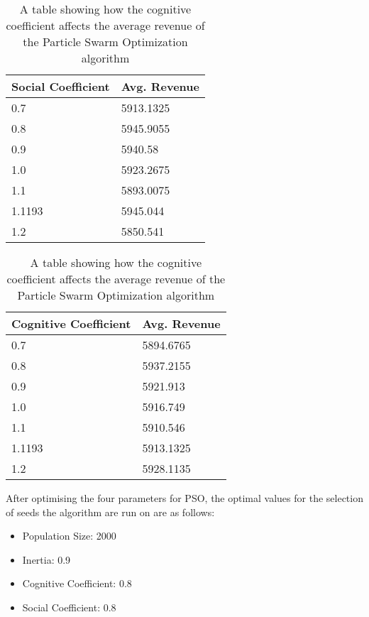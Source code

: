 \documentclass{article}
\begin{document}
\begin{table}[h]
\begin{minipage}[b]{0.45\linewidth}
\centering
\begin{tabular}{@{}ll@{}}
\toprule
Social Coefficient & Avg. Revenue      \\ \midrule
0.7                & 5913.1325         \\
0.8                & 5945.9055         \\
0.9                & 5940.58           \\
1.0                & 5923.2675         \\
1.1                & 5893.0075         \\
1.1193             & 5945.044          \\
1.2                & 5850.541          \\ \bottomrule
\end{tabular}
\caption{A table showing how the social coefficient affects the average revenue of the Particle Swarm Optimization algorithm}
\label{PSO-Social-Coefficient}
\end{minipage}
\hfill
\begin{minipage}[b]{0.45\linewidth}
\centering
\begin{tabular}{@{}ll@{}}
\toprule
Cognitive Coefficient & Avg. Revenue      \\ \midrule
0.7                   & 5894.6765         \\
0.8                   & 5937.2155         \\
0.9                   & 5921.913          \\
1.0                   & 5916.749          \\
1.1                   & 5910.546          \\
1.1193                & 5913.1325         \\
1.2                   & 5928.1135         \\ \bottomrule
\end{tabular}
\caption{A table showing how the cognitive coefficient affects the average revenue of the Particle Swarm Optimization algorithm}
\label{PSO-Cognitive-Coefficient}
\end{minipage}
\end{table}

After optimising the four parameters for PSO, the optimal values for the selection of seeds the algorithm are run on are as follows:
\begin{itemize}[label={}]
  \item Population Size: 2000
  \item Inertia: 0.9
  \item Cognitive Coefficient: 0.8
  \item Social Coefficient: 0.8
\end{itemize}
\end{document}
